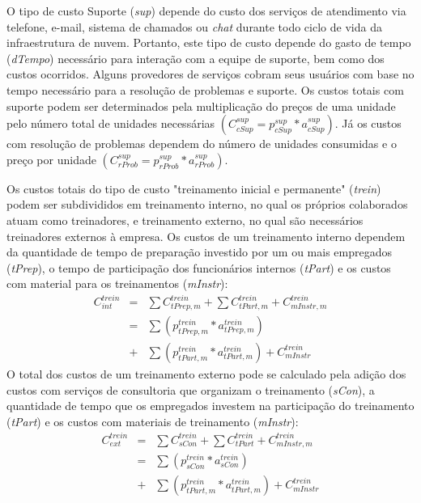 \documentclass[tese,capa]{texufpel}
\begin{document}
O tipo de custo Suporte (\emph{sup}) depende do custo dos serviços de atendimento via telefone, e-mail, sistema de chamados ou \emph{chat} durante todo ciclo de vida da infraestrutura de nuvem. Portanto, este tipo de custo depende do gasto de tempo (\emph{dTempo}) necessário para interação com a equipe de suporte, bem como dos custos ocorridos. Alguns provedores de serviços cobram seus usuários com base no tempo necessário para a resolução de problemas e suporte. Os custos totais com suporte podem ser determinados pela multiplicação do preços de uma unidade pelo número total de unidades necessárias $\left(C^{sup}_{cSup} = p^{sup}_{cSup} * a^{sup}_{cSup}\right)$. Já os custos com resolução de problemas dependem do número de unidades consumidas e o preço por unidade $\left(C^{sup}_{rProb} = p^{sup}_{rProb} * a^{sup}_{rProb }\right)$.

Os custos totais do tipo de custo "treinamento inicial e permanente" (\emph{trein}) podem ser subdivididos em treinamento interno, no qual os próprios colaborados atuam como treinadores, e treinamento externo, no qual são necessários treinadores externos à empresa. Os custos de um treinamento interno dependem da quantidade de tempo de preparação investido por um ou mais empregados (\emph{tPrep}), o tempo de participação dos funcionários internos (\emph{tPart}) e os custos com material para os treinamentos (\emph{mInstr}):
\begin{eqnarray*}
C^{trein}_{int} &=& \sum C^{trein}_{tPrep,m} + \sum C^{trein}_{tPart,m} + C^{trein}_{mInstr,m} \\
                &=& \sum\left(p^{trein}_{tPrep,m} * a^{trein}_{tPrep,m}\right) \\
                &+& \sum\left(p^{trein}_{tPart,m} * a^{trein}_{tPart,m}\right) + C^{trein}_{mInstr}
\end{eqnarray*}
O total dos custos de um treinamento externo pode se calculado pela adição dos custos com serviços de consultoria que organizam o treinamento (\emph{sCon}), a quantidade de tempo que os empregados investem na participação do treinamento (\emph{tPart}) e os custos com materiais de treinamento (\emph{mInstr}):
\begin{eqnarray*}
C^{trein}_{ext} &=& \sum C^{trein}_{sCon} + \sum C^{trein}_{tPart} + C^{trein}_{mInstr,m} \\
                &=& \sum\left(p^{trein}_{sCon} * a^{trein}_{sCon}\right) \\
                &+& \sum\left(p^{trein}_{tPart,m} * a^{trein}_{tPart,m}\right) + C^{trein}_{mInstr}
\end{eqnarray*}
\end{document}
